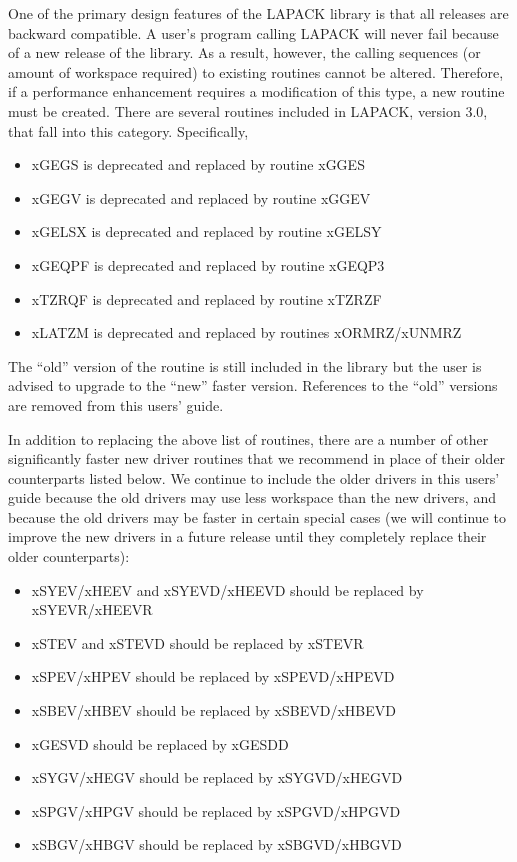 One of the primary design features of the LAPACK library is that all
releases are backward compatible.  A user's program calling LAPACK will
never fail because of a new release of the library.  As a result,
however, the calling sequences (or amount of workspace required) to existing
routines cannot be altered.  Therefore, if a performance enhancement requires a
modification of this type, a new routine must be created.  There are
several routines included in LAPACK, version 3.0, that fall into this
category.  Specifically,
\begin{itemize}
\item xGEGS is deprecated and replaced by routine xGGES
\item xGEGV is deprecated and replaced by routine xGGEV
\item xGELSX is deprecated and replaced by routine xGELSY
\item xGEQPF is deprecated and replaced by routine xGEQP3
\item xTZRQF is deprecated and replaced by routine xTZRZF
\item xLATZM is deprecated and replaced by routines xORMRZ/xUNMRZ
\end{itemize}
The ``old'' version of the routine is still included in the
library but the user is advised to upgrade to the ``new'' faster
version.  References to the ``old'' versions are removed from this
users' guide.

In addition to replacing the above list of routines, there are a number of
other significantly faster new driver routines that we recommend in place of
their older counterparts listed below. We continue to include the older drivers
in this users' guide because the old drivers may use less workspace than the
new drivers, and because the old drivers may be faster in certain special cases
(we will continue to improve the new drivers in a future release until they
completely replace their older counterparts):
\begin{itemize}
\item xSYEV/xHEEV and xSYEVD/xHEEVD should be replaced by xSYEVR/xHEEVR
\item xSTEV and xSTEVD should be replaced by xSTEVR
\item xSPEV/xHPEV should be replaced by xSPEVD/xHPEVD
\item xSBEV/xHBEV should be replaced by xSBEVD/xHBEVD
\item xGESVD should be replaced by xGESDD
\item xSYGV/xHEGV should be replaced by xSYGVD/xHEGVD
\item xSPGV/xHPGV should be replaced by xSPGVD/xHPGVD
\item xSBGV/xHBGV should be replaced by xSBGVD/xHBGVD
\end{itemize}

